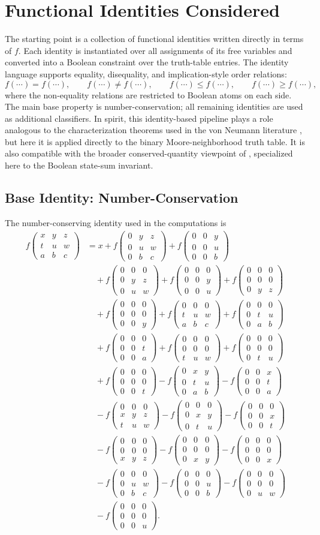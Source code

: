 \documentclass[11pt,a4paper]{article}
\newcommand{\nbhd}[9]{%
  \begin{smallmatrix}
  #1 & #2 & #3 \\
  #4 & #5 & #6 \\
  #7 & #8 & #9
  \end{smallmatrix}
}
\newcommand{\F}[1]{f\!\left(#1\right)}
\begin{document}
\section{Functional Identities Considered}

The starting point is a collection of functional identities written directly in terms of
\(f\).  Each identity is instantiated over all assignments of its free variables and converted
into a Boolean constraint over the truth-table entries.  The identity language supports
equality, disequality, and implication-style order relations:
\[
\F{\cdots}=\F{\cdots},\qquad
\F{\cdots}\neq \F{\cdots},\qquad
\F{\cdots}\le \F{\cdots},\qquad
\F{\cdots}\ge \F{\cdots},
\]
where the non-equality relations are restricted to Boolean atoms on each side.  The main base property is
number-conservation; all remaining identities are used as additional classifiers.  In spirit,
this identity-based pipeline plays a role analogous to the characterization theorems used in the
von Neumann literature \cite{TanimotoImai2009,WolnikDzedzejBaetensDeBaets2017,
DzedzejWolnikNencaBaetensDeBaets2020}, but here it is applied directly to the binary
Moore-neighborhood truth table.  It is also compatible with the broader conserved-quantity
viewpoint of \cite{HattoriTakesue1991,Pivato2002}, specialized here to the Boolean
state-sum invariant.

\subsection{Base Identity: Number-Conservation}

The number-conserving identity used in the computations is
\begingroup\small
\begin{align*}
\F{\nbhd{x}{y}{z}{t}{u}{w}{a}{b}{c}}
&=
x
+ \F{\nbhd{0}{y}{z}{0}{u}{w}{0}{b}{c}}
+ \F{\nbhd{0}{0}{y}{0}{0}{u}{0}{0}{b}} \\
&\quad
+ \F{\nbhd{0}{0}{0}{0}{y}{z}{0}{u}{w}}
+ \F{\nbhd{0}{0}{0}{0}{0}{y}{0}{0}{u}}
+ \F{\nbhd{0}{0}{0}{0}{0}{0}{0}{y}{z}} \\
&\quad
+ \F{\nbhd{0}{0}{0}{0}{0}{0}{0}{0}{y}}
+ \F{\nbhd{0}{0}{0}{t}{u}{w}{a}{b}{c}}
+ \F{\nbhd{0}{0}{0}{0}{t}{u}{0}{a}{b}} \\
&\quad
+ \F{\nbhd{0}{0}{0}{0}{0}{t}{0}{0}{a}}
+ \F{\nbhd{0}{0}{0}{0}{0}{0}{t}{u}{w}}
+ \F{\nbhd{0}{0}{0}{0}{0}{0}{0}{t}{u}} \\
&\quad
+ \F{\nbhd{0}{0}{0}{0}{0}{0}{0}{0}{t}}
- \F{\nbhd{0}{x}{y}{0}{t}{u}{0}{a}{b}}
- \F{\nbhd{0}{0}{x}{0}{0}{t}{0}{0}{a}} \\
&\quad
- \F{\nbhd{0}{0}{0}{x}{y}{z}{t}{u}{w}}
- \F{\nbhd{0}{0}{0}{0}{x}{y}{0}{t}{u}}
- \F{\nbhd{0}{0}{0}{0}{0}{x}{0}{0}{t}} \\
&\quad
- \F{\nbhd{0}{0}{0}{0}{0}{0}{x}{y}{z}}
- \F{\nbhd{0}{0}{0}{0}{0}{0}{0}{x}{y}}
- \F{\nbhd{0}{0}{0}{0}{0}{0}{0}{0}{x}} \\
&\quad
- \F{\nbhd{0}{0}{0}{0}{u}{w}{0}{b}{c}}
- \F{\nbhd{0}{0}{0}{0}{0}{u}{0}{0}{b}}
- \F{\nbhd{0}{0}{0}{0}{0}{0}{0}{u}{w}} \\
&\quad
- \F{\nbhd{0}{0}{0}{0}{0}{0}{0}{0}{u}}.
\end{align*}
\endgroup
\end{document}
